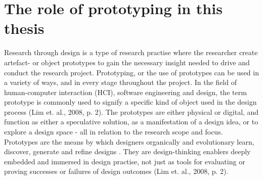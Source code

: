 \section{The role of prototyping in this thesis}
Research through design is a type of research practise where the researcher create artefact- or object prototypes to gain the necessary insight needed to drive and conduct the research project. Prototyping, or the use of prototypes can be used in a variety of ways, and in every stage throughout the project. In the field of human-computer interaction (HCI), software engineering and design, the term prototype is commonly used to signify a specific kind of object used in the design process (Lim et. al., 2008, p. 2). The prototypes are either physical or digital, and function as either a speculative solution, as a manifestation of a design idea, or to explore a design space - all in relation to the research scope and focus. Prototypes are the means by which designers organically and evolutionary learn, discover, generate and refine designs \cite{lim_anatomy_2008, p.2}. They are design-thinking enablers deeply embedded and immersed in design practise, not just as tools for evaluating or proving successes or failures of design outcomes (Lim et. al., 2008, p. 2).

